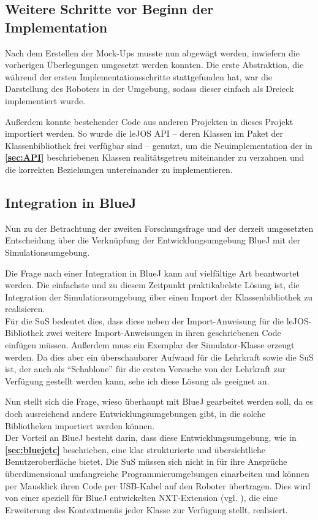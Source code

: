 \documentclass[paper=a4, DIV=calc, BCOR=12mm, twoside=on, onecolumn=on, open = right, titlepage =on, parskip =half-, headsepline = on, footsepline = off, chapterprefix = off, appendixprefix = on, fontsize = 12pt, numbers = noenddot, abstract = on]{scrbook}
\begin{document}
\newpage
\par \singlespacing
\subsection{Weitere Schritte vor Beginn der Implementation}
\onehalfspacing
Nach dem Erstellen der Mock-Ups musste nun abgewägt werden, inwiefern die vorherigen Überlegungen umgesetzt werden konnten. Die erste Abstraktion, die während der ersten Implementationsschritte stattgefunden hat, war die Darstellung des Roboters in der Umgebung, sodass dieser einfach als Dreieck implementiert wurde. 

Außerdem konnte bestehender Code aus anderen Projekten in dieses Projekt importiert werden. So wurde die leJOS API -- deren Klassen im Paket der Klassenbibliothek frei verfügbar sind -- genutzt, um die Neuimplementation der in \textbf{\ref{sec:API}} beschriebenen Klassen realitätsgetreu miteinander zu verzahnen und die korrekten Beziehungen untereinander zu implementieren.

\par \singlespacing
\subsection{Integration in BlueJ}
\label{sec:integration}
\onehalfspacing
Nun zu der Betrachtung der zweiten Forschungsfrage und der derzeit umgesetzten Entscheidung über die Verknüpfung der Entwicklungsumgebung BlueJ mit der Simulationsumgebung.

Die Frage nach einer Integration in BlueJ kann auf vielfältige Art beantwortet werden. Die einfachste und zu diesem Zeitpunkt praktikabelste Lösung ist, die Integration der Simulationsumgebung über einen Import der Klassenbibliothek zu realisieren.\\
Für die SuS bedeutet dies, dass diese neben der Import-Anweisung für die leJOS-Bibliothek zwei weitere Import-Anweisungen in ihren geschriebenen Code einfügen müssen. Außerdem muss ein Exemplar der Simulator-Klasse erzeugt werden. Da dies aber ein überschaubarer Aufwand für die Lehrkraft sowie die SuS ist, der auch als "`Schablone"' für die ersten Versuche von der Lehrkraft zur Verfügung gestellt werden kann, sehe ich diese Lösung als geeignet an.

Nun stellt sich die Frage, wieso überhaupt mit BlueJ gearbeitet werden soll, da es doch ausreichend andere Entwicklungsumgebungen gibt, in die solche Bibliotheken importiert werden können.\\
Der Vorteil an BlueJ besteht darin, dass diese Entwicklungsumgebung, wie in \textbf{\ref{sec:bluejetc}} beschrieben, eine klar strukturierte und übersichtliche Benutzeroberfläche bietet. Die SuS müssen sich nicht in für ihre Ansprüche überdimensional umfangreiche Programmierumgebungen einarbeiten und können per Mausklick ihren Code per USB-Kabel auf den Roboter übertragen. Dies wird von einer speziell für BlueJ entwickelten NXT-Extension (vgl. \cite{bowes:12}), die eine Erweiterung des Kontextmenüs jeder Klasse zur Verfügung stellt, realisiert.
\end{document}
